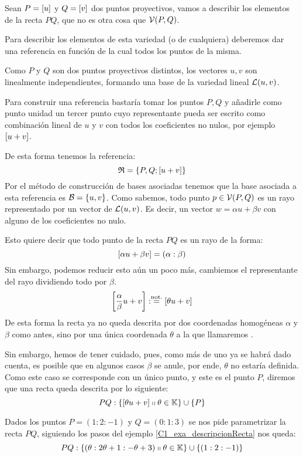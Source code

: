 \begin{exa}
	\label{C1_exa_descripcionRecta}
	Sean $P=\left [ u \right ]$ y $Q=\left [ v \right ]$ dos puntos proyectivos, vamos a describir los elementos de la recta $PQ$, que no es otra cosa que $\mathcal{V}(P,Q)$.
	
	Para describir los elementos de esta variedad (o de cualquiera) deberemos dar una referencia en función de la cual  todos los puntos de la misma.
	
	Como $P$ y $Q$ son dos puntos proyectivos distintos, los vectores $u,v$ son linealmente independientes, formando una base de la variedad lineal $\mathcal{L}(u,v)$.
	
	Para construir una referencia bastaría tomar los puntos $P,Q$ y añadirle como punto unidad un tercer punto cuyo representante pueda ser escrito como combinación lineal de $u$ y $v$ con todos los coeficientes no nulos, por ejemplo $\left [ u+v \right ]$.
	
	De esta forma tenemos la referencia:
	\[\mathfrak{R}=\{P,Q;\left [ u+v \right ]\}\]
	Por el método de construcción de bases asociadas tenemos que la base asociada a esta referencia es $\mathcal{B}=\{u,v\}$. Como sabemos, todo punto $p\in\mathcal{V}(P,Q)$ es un rayo representado por un vector de $\mathcal{L}(u,v)$. Es decir, un vector $w=\alpha u+\beta v$ con alguno de los coeficientes no nulo.
	
	Esto quiere decir que todo punto de la recta $PQ$ es un rayo de la forma: \[\left [ \alpha u+\beta v \right ]=(\alpha:\beta)\]
	Sin embargo, podemos reducir esto aún un poco más, cambiemos el representante del rayo dividiendo todo por $\beta$.
	\[\left [ \frac{\alpha}{\beta}u+v \right ]:\stackrel{\textrm{not.}}{=}\left [ \theta u+v \right ]\]
	De esta forma la recta ya no queda descrita por dos coordenadas homogéneas $\alpha$ y $\beta$ como antes, sino por una única coordenada $\theta$ a la que llamaremos .
	
	Sin embargo, hemos de tener cuidado, pues, como más de uno ya se habrá dado cuenta, es posible que en algunos casos $\beta$ se anule, por ende, $\theta$ no estaría definida. Como este caso se corresponde con un único punto, y este es el punto $P$, diremos que una recta queda descrita por lo siguiente:
	\begin{equation}
	\label{C1_eq_descripcionRecta}
		PQ:\{\left [ \theta u+v \right ]\shortparallel \theta\in\mathbb{K}\}\cup\{P\}
	\end{equation}
\end{exa}
\begin{exa}
	\label{C1_exa_rectaConcreta}
	Dados los puntos $P=(1:2:-1)$ y $Q=(0:1:3)$ se nos pide parametrizar la recta $PQ$, siguiendo los pasos del ejemplo \ref{C1_exa_descripcionRecta} nos queda:
	\[
	PQ:\{(\theta:2\theta+1:-\theta+3)\shortparallel\theta\in\mathbb{K}\}\cup\{(1:2:-1)\}
	\]
\end{exa}
